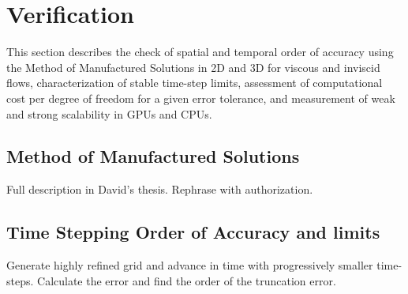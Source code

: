 \section{Verification}
This section describes the check of spatial and temporal order of accuracy using the Method of Manufactured Solutions in 2D and 3D for viscous and inviscid flows, characterization of stable time-step limits, assessment of computational cost per degree of freedom for a given error tolerance, and measurement of weak and strong scalability in GPUs and CPUs.

\subsection{Method of Manufactured Solutions}
Full description in David's thesis. Rephrase with authorization.

\subsection{Time Stepping Order of Accuracy and limits}
Generate highly refined grid and advance in time with progressively smaller time-steps. Calculate the error and find the order of the truncation error.

%
%
